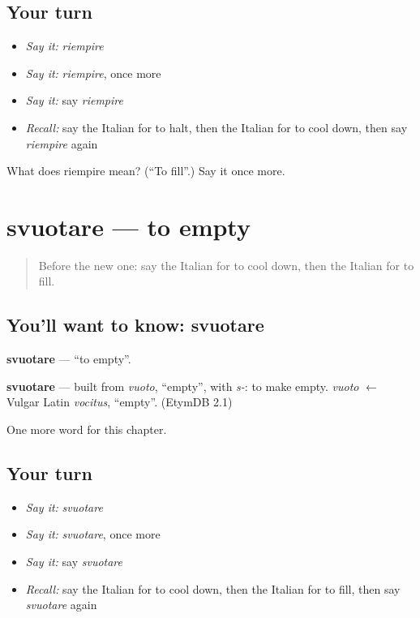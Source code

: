 \subsection*{Your turn}
\begin{itemize}
\raggedright
  \item \emph{Say it:} \emph{riempire}
  \item \emph{Say it:} \emph{riempire}, once more
  \item \emph{Say it:} say \emph{riempire}
  \item \emph{Recall:} say the Italian for to halt, then the Italian for to cool down, then say \emph{riempire} again
\end{itemize}

\begin{tcolorbox}[breakable,colback=teal!4,colframe=teal!35!black,title={Before you move on}]
What does riempire mean? (\textquotedblleft{}To fill\textquotedblright{}.) Say it once more.
\end{tcolorbox}
\section[svuotare]{svuotare — to empty}

\label{lesson:IT-C206-svuotare}



\begin{quote}
Before the new one: say the Italian for to cool down, then the Italian for to fill.
\end{quote}

\subsection*{You'll want to know: svuotare}
\textbf{svuotare} — \textquotedblleft{}to empty\textquotedblright{}.

\begin{cousinweb}
\textbf{svuotare} — built from \emph{vuoto}, \textquotedblleft{}empty\textquotedblright{}, with \emph{s-}: to make empty. \emph{vuoto} $\leftarrow$ Vulgar Latin \emph{vocitus}, \textquotedblleft{}empty\textquotedblright{}. (EtymDB 2.1)
\end{cousinweb}

\begin{grammarlens}[title={What you've built}]
One more word for this chapter.
\end{grammarlens}

\subsection*{Your turn}
\begin{itemize}
\raggedright
  \item \emph{Say it:} \emph{svuotare}
  \item \emph{Say it:} \emph{svuotare}, once more
  \item \emph{Say it:} say \emph{svuotare}
  \item \emph{Recall:} say the Italian for to cool down, then the Italian for to fill, then say \emph{svuotare} again
\end{itemize}

